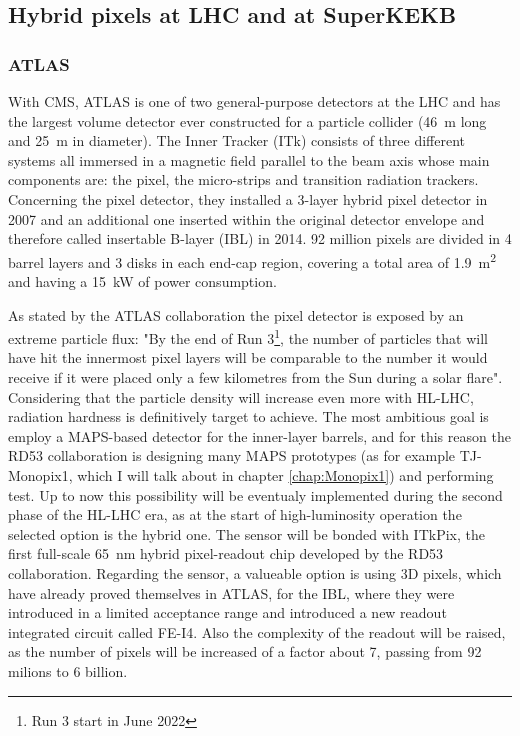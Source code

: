     \subsection{Hybrid pixels at LHC and at SuperKEKB}
        \subsubsection{ATLAS}    
        With CMS, ATLAS is one of two general-purpose detectors at the LHC and has the largest volume detector ever constructed for a particle
        collider (\SI{46}{m} long and \SI{25}{m} in diameter).  
        The Inner Tracker (ITk) consists of three different systems all immersed in a magnetic field parallel to the beam axis whose main components are: the pixel, the micro-strips and transition radiation trackers. 
        Concerning the pixel detector, they installed a 3-layer hybrid pixel detector in 2007 and an additional one inserted within the original detector envelope and therefore called insertable B-layer (IBL) in 2014.
        92 million pixels are divided in 4 barrel layers and 3 disks in each end-cap region, covering a total area of \SI{1.9}{m\squared} and having a \SI{15}{kW} of power consumption. 

        As stated by the ATLAS collaboration the pixel detector is exposed by an extreme particle flux: "By the end of Run 3\footnote{Run 3 start in June 2022}, the number of particles that will have hit the innermost pixel layers will be comparable to the number it would receive if it were placed only a few kilometres from the Sun during a solar flare". Considering that the particle density will increase even more with HL-LHC, radiation hardness is definitively target to achieve. 
        The most ambitious goal is employ a MAPS-based detector for the inner-layer barrels, and for this reason the RD53 collaboration is designing many MAPS prototypes (as for example TJ-Monopix1, which I will talk about in chapter \ref{chap:Monopix1}) and performing test.
        Up to now this possibility will be eventualy implemented during the second phase of the HL-LHC era, as at the start of high-luminosity operation the selected option is the hybrid one. The sensor will be bonded with ITkPix, the first full-scale \SI{65}{nm} hybrid pixel-readout chip developed by the RD53 collaboration.
        Regarding the sensor, a valueable option is using 3D pixels, which have already proved themselves in ATLAS, for the IBL, where they were introduced in a limited acceptance range and introduced a new readout integrated circuit called FE-I4.  
        Also the complexity of the readout will be raised, as the number of pixels will be increased of a factor about 7, passing from 92 milions to 6 billion.
    
